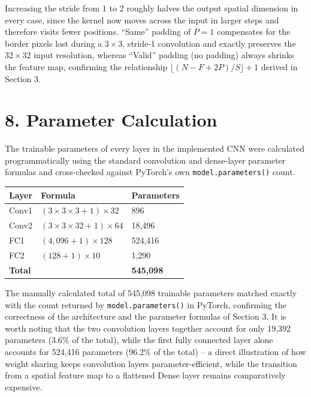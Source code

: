 \documentclass[11pt,a4paper]{article}
\begin{document}
\vspace{0.15cm}

Increasing the stride from 1 to 2 roughly halves the output spatial dimension in every case, since the kernel now moves across the input in larger steps and therefore visits fewer positions. ``Same'' padding of $P=1$ compensates for the border pixels lost during a $3\times3$, stride-1 convolution and exactly preserves the $32\times32$ input resolution, whereas ``Valid'' padding (no padding) always shrinks the feature map, confirming the relationship $\lfloor(N-F+2P)/S\rfloor+1$ derived in Section 3.
\newpage
\section*{8. Parameter Calculation}

The trainable parameters of every layer in the implemented CNN were calculated programmatically using the standard convolution and dense-layer parameter formulas and cross-checked against PyTorch's own \texttt{model.parameters()} count.

\begin{center}
\begin{tabular}{|p{5cm}|p{4cm}|p{4cm}|}
\hline
\textbf{Layer} & \textbf{Formula} & \textbf{Parameters}\\
\hline
Conv1 & $(3\times3\times3+1)\times32$ & 896\\
\hline
Conv2 & $(3\times3\times32+1)\times64$ & 18{,}496\\
\hline
FC1 & $(4{,}096+1)\times128$ & 524{,}416\\
\hline
FC2 & $(128+1)\times10$ & 1{,}290\\
\hline
\textbf{Total} & & \textbf{545{,}098}\\
\hline
\end{tabular}
\end{center}

\vspace{0.15cm}

The manually calculated total of 545{,}098 trainable parameters matched exactly with the count returned by \texttt{model.parameters()} in PyTorch, confirming the correctness of the architecture and the parameter formulas of Section 3. It is worth noting that the two convolution layers together account for only 19{,}392 parameters (3.6\% of the total), while the first fully connected layer alone accounts for 524{,}416 parameters (96.2\% of the total) -- a direct illustration of how weight sharing keeps convolution layers parameter-efficient, while the transition from a spatial feature map to a flattened Dense layer remains comparatively expensive.
\end{document}
